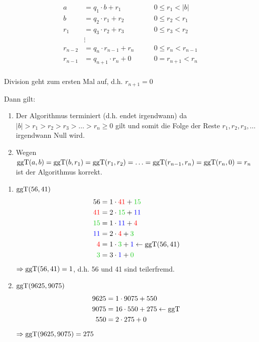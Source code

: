 \begin{align*}
a &= q_1\cdot b + r_1\qquad& 0\le r_1<|b|\\
b &= q_2\cdot r_1 + r_2\qquad& 0\le r_2<r_1\\
r_1 &= q_3\cdot r_2 + r_3\qquad& 0\le r_3<r_2\\
&\vdots\\
r_{n-2} &= q_n\cdot r_{n-1} + r_n\qquad& 0\le r_n<r_{n-1}\\
r_{n-1} &= q_{n+1}\cdot r_n + 0\qquad& 0= r_{n+1}<r_n\\
\end{align*}

Division geht zum ersten Mal auf, d.h. $r_{n+1} = 0$

Dann gilt: 

\Bem
\begin{enumerate}
	\item Der Algorithmus terminiert (d.h. endet irgendwann) da $|b|>r_1>r_2>r_3>\ldots>r_n\ge 0$ gilt und somit die Folge der Reste $r_1,r_2,r_3,\ldots$ irgendwann Null wird.
	
	\item Wegen $\mathbin\text{ggT}(a,b)=\mathbin\text{ggT}(b,r_1)= \mathbin\text{ggT}(r_1,r_2)=\ldots = \mathbin\text{ggT}(r_{n-1},r_n) = \mathbin\text{ggT}(r_n, 0) = r_n$ ist der Algorithmus korrekt.
\end{enumerate}

\Bsps
\begin{enumerate}
	\item $\mathbin\text{ggT}(56,41)$
	\begin{align*}
	56 &=1\cdot \red{41}+\green{15}\\
	\red{41} &=2\cdot \green{15}+\blue{11}\\
	\green{15} &=1\cdot \blue{11}+\red{4}\\
	\blue{11} &=2\cdot \red{4}+\green{3}\\
	\red{4} &=1\cdot \green{3}+\blue{1} \leftarrow \ggT(56,41)\\
	\green{3} &=3\cdot \blue{1}+\green{0}
	\end{align*}
	$\Rightarrow \mathbin\text{ggT}(56,41) = 1$, d.h. 56 und 41 sind teilerfremd. 
	
	\item $\mathbin\text{ggT}(9625,9075)$
	\begin{align*}
	9625 &=1\cdot 9075+550\\
	9075 &=16\cdot 550+275 \leftarrow\mathbin\text{ggT}\\
	550 &=2\cdot 275+0\\
	\end{align*}
	$\Rightarrow \mathbin\text{ggT}(9625,9075) = 275$
	
\end{enumerate}

